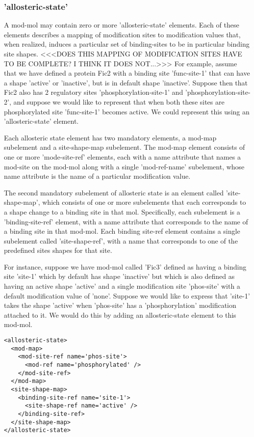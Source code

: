 \subsubsection{'allosteric-state'}
A mod-mol may contain zero or more 'allosteric-state' elements.  Each
of these elements describes a mapping of modification sites to
modification values that, when realized, induces a particular set of
binding-sites to be in particular binding site shapes.  <<<DOES THIS
MAPPING OF MODIFICATION SITES HAVE TO BE COMPLETE?  I THINK IT DOES
NOT...>>> For example, assume that we have defined a protein Fic2 with
a binding site 'func-site-1' that can have a shape 'active' or
'inactive', but is in default shape 'inactive'.  Suppose then that
Fic2 also has 2 regulatory sites 'phosphorylation-site-1' and
'phosphorylation-site-2', and suppose we would like to represent that
when both these sites are phosphorylated site 'func-site-1' becomes
active.  We could represent this using an 'allosteric-state' element.

Each allosteric state element has two mandatory elements, a mod-map
subelement and a site-shape-map subelement.  The mod-map element
consists of one or more 'mode-site-ref' elements, each with a name
attribute that names a mod-site on the mod-mol along with a single
'mod-ref-name' subelement, whose name attribute is the name of a
particular modification value.  

The second mandatory subelement of allosteric state is an element
called 'site-shape-map', which consists of one or more subelements
that each corresponds to a shape change to a binding site in that
mol.  Specifically, each subelement is a 'binding-site-ref' element,
with a name attribute that corresponds to the name of a binding site
in that mod-mol.  Each binding site-ref element contains a single
subelement called 'site-shape-ref', with a name that corresponds to
one of the predefined sites shapes for that site.  

For instance, suppose we have mod-mol called 'Fic3' defined as having
a binding site 'site-1' which by default has shape 'inactive' but
which is also defined as having an active shape 'active' and a single
modification site 'phos-site' with a default modification value of
'none'.  Suppose we would like to express that 'site-1' takes the
shape 'active' when 'phos-site' has a 'phosphorylation' modification
attached to it.  We would do this by adding an allosteric-state
element to this mod-mol.

\lstset{language=XML}
\begin{lstlisting}[caption=An example of an allosteric-state element, label=allostericstateexample]
<allosteric-state>
  <mod-map>
    <mod-site-ref name='phos-site'>
      <mod-ref name='phosphorylated' />
    </mod-site-ref>
  </mod-map>
  <site-shape-map>
    <binding-site-ref name='site-1'>
      <site-shape-ref name='active' />
    </binding-site-ref>
  </site-shape-map>
</allosteric-state>
\end{lstlisting}

